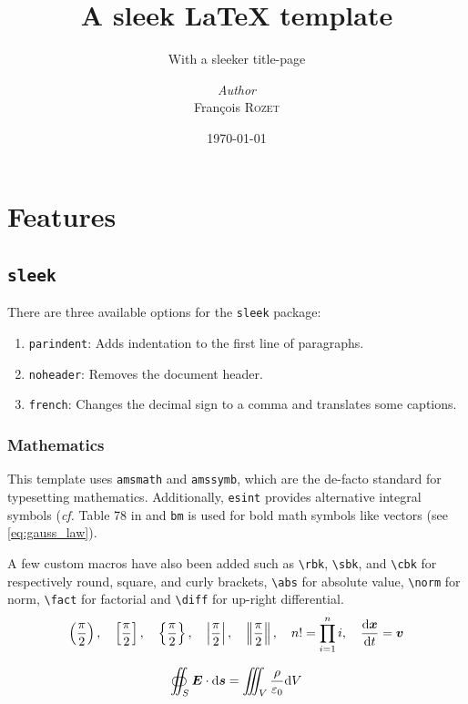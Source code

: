 \documentclass[a4paper, 12pt]{report}
\institute{Random University}
\title{A sleek \LaTeX{} template}
\subtitle{With a sleeker title-page}
\author{\textit{Author}\\François \textsc{Rozet}}
\date{\today}
\def\tbs{\textbackslash}
\begin{document}
    \maketitle
    \romantableofcontents

   
\chapter{Features}

\section{\texttt{sleek}}

There are three available options for the \texttt{sleek} package:

\begin{enumerate}[noitemsep]
	\item \texttt{parindent}: Adds indentation to the first line of paragraphs.
	\item \texttt{noheader}: Removes the document header.
	\item \texttt{french}: Changes the decimal sign to a comma and translates some captions.
\end{enumerate}


\subsection{Mathematics}

This template uses \texttt{amsmath} and \texttt{amssymb}, which are the de-facto standard for typesetting mathematics. Additionally, \texttt{esint} provides alternative integral symbols (\emph{cf.} Table 78 in and \texttt{bm} is used for bold math symbols like vectors (see \eqref{eq:gauss_law}).

A few custom macros have also been added such as \texttt{\tbs{}rbk}, \texttt{\tbs{}sbk}, and \texttt{\tbs{}cbk} for respectively round, square, and curly brackets, \texttt{\tbs{}abs} for absolute value, \texttt{\tbs{}norm} for norm, \texttt{\tbs{}fact} for factorial and \texttt{\tbs{}diff} for up-right differential.
$$
\left(\frac{\pi}{2}\right), \quad \left[\frac{\pi}{2}\right], \quad \left\{\frac{\pi}{2}\right\}, \quad \left|\frac{\pi}{2}\right|, \quad \left\|\frac{\pi}{2}\right\|, \quad n! = \prod_{i = 1}^{n} i, \quad \frac{\mathrm{d} \bm{x}}{\mathrm{d} t} = \bm{v}
$$

\begin{equation}\label{eq:gauss_law}
	\oiint_S \bm{E} \cdot \mathrm{d} \bm{s} = \iiint_V \frac{\rho}{\varepsilon_0} \mathrm{d} V
\end{equation}
\end{document}
